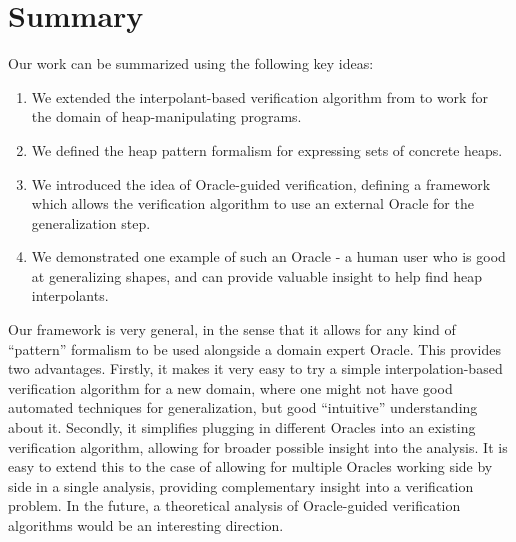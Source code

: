 \section{Summary}
Our work can be summarized using the following key ideas:

\begin{enumerate}
  \item We extended the interpolant-based verification algorithm from \cite{mcmillan06} to work for the domain of heap-manipulating programs.
  \item We defined the heap pattern formalism for expressing sets of concrete heaps.
  \item We introduced the idea of Oracle-guided verification, defining a framework which allows the verification algorithm to use an external Oracle for the generalization step.
  \item We demonstrated one example of such an Oracle - a human user who is good at generalizing shapes, and can provide valuable insight to help find heap interpolants.
\end{enumerate}

Our framework is very general, in the sense that it allows for any kind of ``pattern''
formalism to be used alongside a domain expert Oracle. This provides two advantages.
Firstly, it makes it very easy to try a simple interpolation-based verification
algorithm for a new domain, where one might not have good automated techniques for
generalization, but good ``intuitive'' understanding about it. Secondly, it simplifies
plugging in different Oracles into an existing verification algorithm, allowing for
broader possible insight into the analysis. It is easy to extend this to the case of
allowing for multiple Oracles working side by side in a single analysis, providing
complementary insight into a verification problem. In the future, a theoretical analysis
of Oracle-guided verification algorithms would be an interesting direction.
